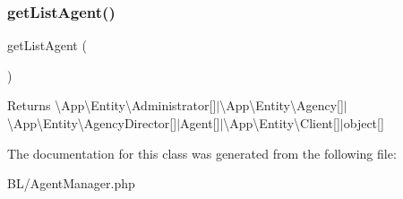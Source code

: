 \subsubsection{\texorpdfstring{getListAgent()}{getListAgent()}}
{\footnotesize\ttfamily get\+List\+Agent (\begin{DoxyParamCaption}{ }\end{DoxyParamCaption})}

\begin{DoxyReturn}{Returns}
\textbackslash{}\+App\textbackslash{}\+Entity\textbackslash{}\+Administrator\mbox{[}\mbox{]}$\vert$\textbackslash{}\+App\textbackslash{}\+Entity\textbackslash{}\+Agency\mbox{[}\mbox{]}$\vert$\textbackslash{}\+App\textbackslash{}\+Entity\textbackslash{}\+Agency\+Director\mbox{[}\mbox{]}$\vert$\+Agent\mbox{[}\mbox{]}$\vert$\textbackslash{}\+App\textbackslash{}\+Entity\textbackslash{}\+Client\mbox{[}\mbox{]}$\vert$object\mbox{[}\mbox{]} 
\end{DoxyReturn}


The documentation for this class was generated from the following file\+:\begin{DoxyCompactItemize}
\item 
B\+L/Agent\+Manager.\+php\end{DoxyCompactItemize}
